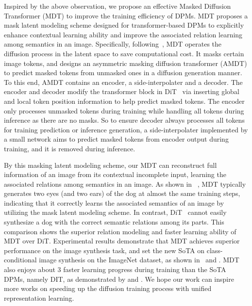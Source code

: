 \documentclass[final]{cvpr}
\begin{document}
Inspired by the above observation, 
we propose an effective Masked Diffusion Transformer (MDT) to improve the training efficiency of DPMs.    
MDT proposes a mask latent modeling scheme  
designed for transformer-based DPMs to 
explicitly enhance contextual learning ability and improve the associated relation learning 
among semantics in an image.  
Specifically, following~\cite{rombach2022high,peebles2022scalable}, MDT operates the diffusion process in the latent space to save computational cost. 
It  masks certain image tokens, and designs an asymmetric masking diffusion transformer (AMDT) to predict  masked  tokens from unmasked  ones  in a diffusion generation manner. 
To this end, AMDT contains an encoder, a side-interpolater and a decoder.  The encoder and decoder  modify  the  transformer block  in DiT~\cite{peebles2022scalable} via  inserting  global and  local  token position information to help predict  masked tokens.  
The encoder  only  processes unmasked  tokens during training while  handling all tokens during inference as there are no masks. 
So to ensure decoder always processes all tokens for training prediction  or inference  generation, 
a side-interpolater implemented by a small network aims to predict masked tokens from  encoder output during training, and it is removed during inference. 


By this masking latent modeling scheme,  our MDT can reconstruct full information of an image from its contextual incomplete input, 
learning the associated relations among semantics in an image. 
As shown in ~,
MDT typically generates
two eyes (and two ears) of the dog at almost the same training steps,
indicating that it correctly learns the associated semantics of an image by utilizing the mask latent modeling scheme.
In contrast,  DiT~\cite{peebles2022scalable} cannot easily synthesize
a dog with the correct semantic relations among its parts.
This comparison shows the superior relation modeling and faster learning ability of MDT over DiT.  
Experimental results demonstrate that MDT achieves superior performance on the image synthesis task, and set the new SoTA on class-conditional image synthesis on the ImageNet dataset,
as shown in~ and .
MDT also enjoys about 3 faster learning progress during training than the SoTA DPMs, namely DIT, as demonstrated by  and  .  
We hope our work can inspire more works on speeding up the diffusion training process with unified representation learning.  
\end{document}
